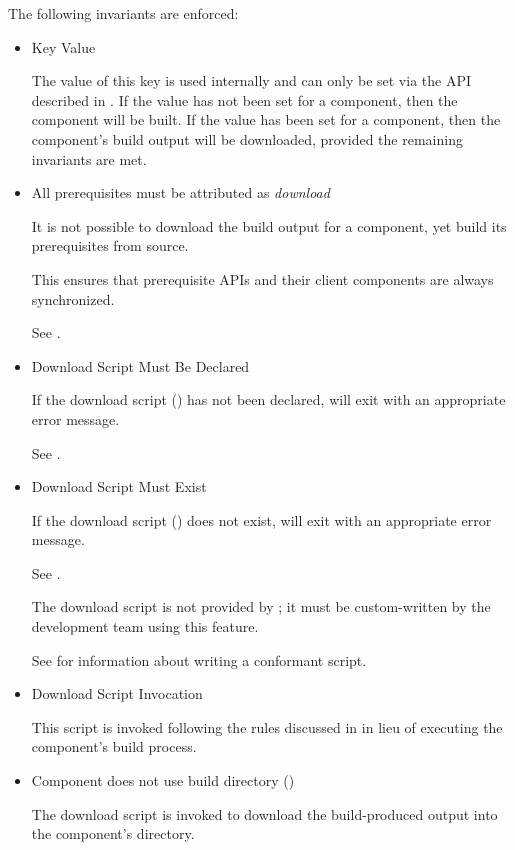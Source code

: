 The following invariants are enforced:

\begin{itemize}
\item Key Value

  The value of this key is used internally and can only be set via the
  API described in .  If the value has
  not been set for a component, then the component will be built.  If
  the value has been set for a component, then the component's build
  output will be downloaded, provided the remaining invariants are
  met.

\item{All prerequisites must be attributed as \emph{download}}

  It is not possible to download the build output for a component, yet
  build its prerequisites from source.

  This ensures that prerequisite APIs and their client components are
  always synchronized.

  See .

\item{Download Script Must Be Declared}

  If the download script
  () has not
  been declared, \lmsbw will exit with an appropriate error
  message.

  See .

\item{Download Script Must Exist}

  If the download script
  () does not
  exist, \lmsbw will exit with an appropriate error message.

  See .

  The download script is not provided by \lmsbw; it must be
  custom-written by the development team using this feature.

  See  for information about
  writing a conformant script.

\item{Download Script Invocation}

  This script is invoked following the rules discussed in
   in lieu of executing the
  component's build process.

\item{Component does not use build directory ()}

  The download script is invoked to download the build-produced output
  into the component's \destdir directory.

\end{itemize}

